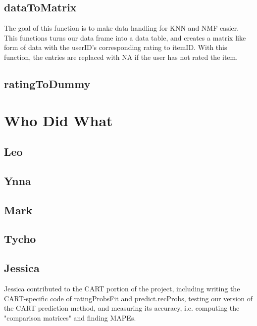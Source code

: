 \documentclass{article}
\begin{document}
\subsection{dataToMatrix}
The goal of this function is to make data handling for KNN and NMF easier. This functions turns our data frame into a data table, and creates a matrix like form of data with the userID's corresponding rating to itemID. With this function, the entries are replaced with NA if the user has not rated the item.

\subsection{ratingToDummy}


\section{Who Did What}
\subsection{Leo}

\subsection{Ynna}

\subsection{Mark}

\subsection{Tycho}

\subsection{Jessica}
Jessica contributed to the CART portion of the project, including writing the CART-specific code of ratingProbsFit and predict.recProbs, testing our version of the CART prediction method, and measuring its accuracy, i.e. computing the "comparison matrices" and finding MAPEs.
\end{document}
